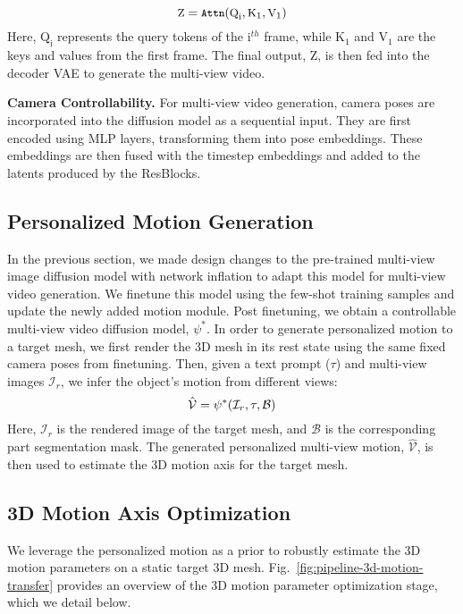 \begin{equation}
\small
    \text{Z} = \texttt{Attn}(\text{Q}_{\text{i}}, \text{K}_{1}, \text{V}_{1})
    \label{eq: temp_attention}
\end{equation}
Here, $\text{Q}_{\text{i}}$ represents the query tokens of the $\text{i}^{th}$ frame, while $\text{K}_{1}$ and $\text{V}_{1}$ are the keys and values from the first frame. The final output, $\text{Z}$, is then fed into the decoder VAE to generate the multi-view video.


\noindent \textbf{Camera Controllability.} For multi-view video generation, camera poses are incorporated into the diffusion model as a sequential input. They are first encoded using MLP layers, transforming them into pose embeddings. These embeddings are then fused with the timestep embeddings and added to the latents produced by the ResBlocks.

\subsection{Personalized Motion Generation}
\label{sec: personalized_motion_inference}

In the previous section, we made design changes to the pre-trained multi-view image diffusion model with network inflation to adapt this model for multi-view video generation. We finetune this model using the few-shot training samples and update the newly added motion module. Post finetuning, we obtain a controllable multi-view video diffusion model, $\psi^{*}$. In order to generate personalized motion to a target mesh, we first render the 3D mesh in its rest state using the same fixed camera poses from finetuning. Then, given a text prompt ($\tau$) and multi-view images $\mathcal{I}_{r}$, we infer the object's motion from different views:
\begin{equation}
\small
    \hat{\mathcal{V}} = \psi^{*}(\mathcal{I}_{r},\tau,\mathcal{B})
    \label{eq: personalization}
\end{equation}
Here, $\mathcal{I}_{r}$ is the rendered image of the target mesh, and $\mathcal{B}$ is the corresponding part segmentation mask. The generated personalized multi-view motion, $\hat{\mathcal{V}}$, is then used to estimate the 3D motion axis for the target mesh.



\subsection{3D Motion Axis Optimization} 
\label{sec: 3D motion inference}
We leverage the personalized motion as a prior to robustly estimate the 3D motion parameters on a static target 3D mesh. Fig.~\ref{fig:pipeline-3d-motion-transfer} provides an overview of the 3D motion parameter optimization stage, which we detail below. 

